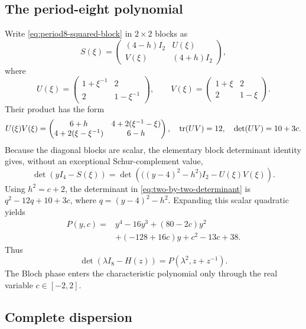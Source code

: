 \subsection{The period-eight polynomial}

Write \eqref{eq:period8-squared-block} in $2\times2$ blocks as
\[
 S(\xi)=
 \begin{pmatrix}(4-h)I_2&U(\xi)\\V(\xi)&(4+h)I_2\end{pmatrix},
\]
where
\[
 U(\xi)=\begin{pmatrix}1+\xi^{-1}&2\\2&1-\xi^{-1}\end{pmatrix},
 \qquad
 V(\xi)=\begin{pmatrix}1+\xi&2\\2&1-\xi\end{pmatrix}.
\]
Their product has the form
\begin{equation}
 U(\xi)V(\xi)=
 \begin{pmatrix}
 6+h&4+2(\xi^{-1}-\xi)\\
 4+2(\xi-\xi^{-1})&6-h
 \end{pmatrix},
 \quad \operatorname{tr}(UV)=12,\quad \det(UV)=10+3c.
 \label{eq:uv-invariants}
\end{equation}
Because the diagonal blocks are scalar, the elementary block determinant
identity gives, without an exceptional Schur-complement value,
\begin{equation}
 \det(yI_4-S(\xi))
 =\det\!\left(\bigl((y-4)^2-h^2\bigr)I_2-U(\xi)V(\xi)\right).
 \label{eq:two-by-two-determinant}
\end{equation}
Using $h^2=c+2$, the determinant in
\eqref{eq:two-by-two-determinant} is $q^2-12q+10+3c$, where
$q=(y-4)^2-h^2$.  Expanding this scalar quadratic yields
\begin{equation}
\begin{split}
 P(y,c)={}&y^4-16y^3+(80-2c)y^2\\
          &+(-128+16c)y+c^2-13c+38.
\end{split}
\label{eq:period8-polynomial}
\end{equation}
Thus
\begin{equation}
 \det(\lambda I_8-H(z))=P(\lambda^2,z+z^{-1}).
 \label{eq:period8-characteristic}
\end{equation}
The Bloch phase enters the characteristic polynomial only through the real
variable $c\in[-2,2]$.

\subsection{Complete dispersion}

